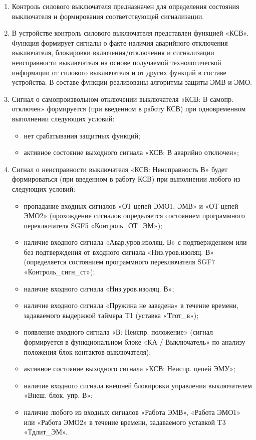 
\color{black}

\begin{enumerate}

\item
Контроль силового выключателя предназначен для определения состояния выключателя и формирования соответствующей сигнализации. 

\item
В устройстве контроль силового выключателя представлен функцией «КСВ». Функция формирует сигналы о факте наличия аварийного отключения выключателя, блокировки включения/отключения и сигнализации неисправности выключателя на основе получаемой технологической информации от силового выключателя и от других функций в составе устройства. В составе функции реализованы алгоритмы защиты ЭМВ и ЭМО.

\item
Сигнал о самопроизвольном отключении выключателя «КСВ: В самопр. отключен» формируется (при введенном в работу КСВ) при одновременном выполнении следующих условий:
\begin{itemize}
\item нет срабатывания защитных функций;
\item активное состояние выходного сигнала «КСВ: В аварийно отключен»;
\end{itemize}

\item
Сигнал о неисправности выключателя «КСВ: Неисправность В» будет формироваться (при введенном в работу КСВ) при выполнении любого из следующих условий:
\begin{itemize}
\sloppy
\item пропадание входных сигналов «ОТ цепей ЭМО1, ЭМВ» и «ОТ цепей ЭМО2» (прохождение сигналов определяется состоянием программного переключателя SGF5 «Контроль\_ОТ\_ЭМ»);
\item наличие входного сигнала «Авар.уров.изоляц. В» с подтверждением или без подтверждения от входного сигнала «Низ.уров.изоляц. В» (определяется состоянием программного переключателя SGF7 «Контроль\_сигн\_ст»);
\item наличие входного сигнала «Низ.уров.изоляц. В»;
\item наличие входного сигнала «Пружина не заведена» в течение времени, задаваемого выдержкой таймера T1 (уставка «Tгот\_в»);
\item появление входного сигнала «В: Неиспр. положение» (сигнал формируется в функциональном блоке «КА / Выключатель» по анализу положения блок-контактов выключателя);
\item активное состояние выходного сигнала «КСВ: Неиспр. цепей ЭМУ»;
\item наличие входного сигнала внешней блокировки управления выключателем «Внеш. блок. упр. В»;
\item наличие любого из входных сигналов «Работа ЭМВ», «Работа ЭМО1» или «Работа ЭМО2» в течение времени, задаваемого уставкой T3 «Тдлит\_ЭМ».
\end{itemize}


\end{enumerate}
